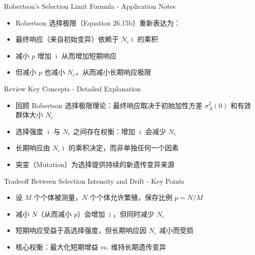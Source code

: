 \documentclass[10pt, aspectratio=169]{ctexbeamer}
\begin{document}
\begin{frame}{Robertson's Selection Limit Formula - Application Notes}
  \begin{itemize}
    \item Robertson 选择极限（Equation 26.15b）重新表达为：
    \item 最终响应（来自初始变异）依赖于 $N_e \bar{\imath}$ 的乘积
    \item 减小 $p$ 增加 $\bar{\imath}$ 从而增加短期响应
    \item 但减小 $p$ 也减小 $N_e$，从而减小长期响应极限
  \end{itemize}
\end{frame}

\begin{frame}{Review Key Concepts - Detailed Explanation}
  \begin{itemize}
    \item 回顾 Robertson 选择极限理论：最终响应取决于初始加性方差 $\sigma_A^2(0)$ 和有效群体大小 $N_e$
    \item 选择强度 $\bar{\imath}$ 与 $N_e$ 之间存在权衡：增加 $\bar{\imath}$ 会减少 $N_e$
    \item 长期响应由 $N_e \bar{\imath}$ 的乘积决定，而非单独任何一个因素
    \item 突变（Mutation）为选择提供持续的新遗传变异来源
  \end{itemize}
\end{frame}

\begin{frame}{Tradeoff Between Selection Intensity and Drift - Key Points}
  \begin{itemize}
    \item 设 $M$ 个个体被测量，$N$ 个个体允许繁殖，保存比例 $p = N/M$
    \item 减小 $N$（从而减小 $p$）会增加 $\bar{\imath}$，但同时减少 $N_e$
    \item 短期响应受益于高选择强度，但长期响应因 $N_e$ 减小而受损
    \item 核心权衡：最大化短期增益 vs. 维持长期遗传变异
  \end{itemize}
\end{frame}
\end{document}
